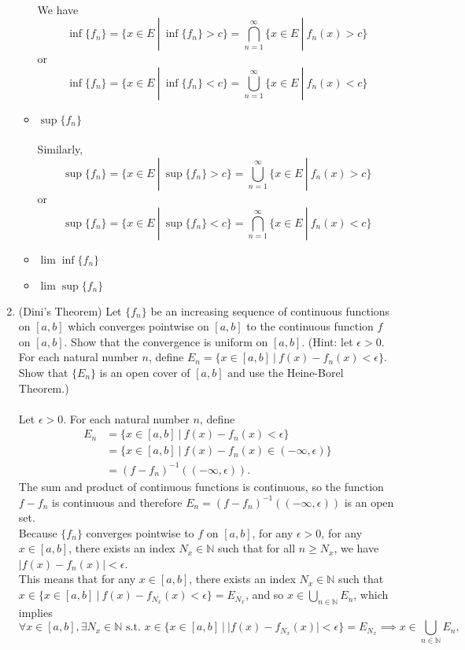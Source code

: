 \begin{enumerate}
\begin{itemize}
        \\We have 
        \[
            \inf\{f_n\} = \{x\in E\ |\ \inf\{f_n\}> c\} = \bigcap_{n=1}^\infty\{x\in E\ |\ f_n(x)>c\}
        \]
        or
        \[
            \inf\{f_n\} = \{x\in E\ |\ \inf\{f_n\}< c\} = \bigcup_{n=1}^\infty\{x\in E\ |\ f_n(x)<c\}
        \]
        \item $\sup\{f_n\}$\\
        \\Similarly,
        \[
            \sup\{f_n\} = \{x\in E\ |\ \sup\{f_n\}> c\} = \bigcup_{n=1}^\infty\{x\in E\ |\ f_n(x)>c\}
        \]
        or
        \[
            \sup\{f_n\} = \{x\in E\ |\ \sup\{f_n\}< c\} = \bigcap_{n=1}^\infty\{x\in E\ |\ f_n(x)<c\}
        \]
        \item $\lim\inf\{f_n\}$
        \item $\lim\sup\{f_n\}$
    \end{itemize}
    \item (Dini's Theorem) Let $\{f_n\}$ be an increasing sequence of continuous functions on $[a,b]$ which converges pointwise on $[a,b]$ to the continuous function $f$ on $[a,b]$.
    Show that the convergence is uniform on $[a,b]$. (Hint: let $\epsilon>0$. For each natural number $n$, define $E_n=\{x\in[a,b]\ |\ f(x)-f_n(x)<\epsilon\}$. Show that $\{E_n\}$ is an open cover of $[a,b]$ and use the Heine-Borel Theorem.)\\
    \\Let $\epsilon>0$. For each natural number $n$, define 
    \begin{align*}
        E_n&=\{x\in[a,b]\ |\ f(x)-f_n(x)<\epsilon\}\\
        &=\{x\in[a,b]\ |\ f(x)-f_n(x)\in(-\infty,\epsilon)\}\\
        &=(f-f_n)^{-1}((-\infty,\epsilon)).
    \end{align*}
    The sum and product of continuous functions is continuous, so the function $f-f_n$ is continuous and therefore $E_n=(f-f_n)^{-1}((-\infty,\epsilon))$ is an open set.
    \\Because $\{f_n\}$ converges pointwise to $f$ on $[a,b]$, for any $\epsilon>0$, for any $x\in[a,b]$, there exists an index $N_x\in\mathbb{N}$ such that for all $n\ge N_x$, we have $|f(x)-f_n(x)|<\epsilon$.
    \\This means that for any $x\in[a,b]$, there exists an index $N_x\in\mathbb{N}$ such that $x\in\{x\in[a,b]\ |\ f(x)-f_{N_x}(x)<\epsilon\}=E_{N_x}$, and so $x\in\bigcup_{n\in\mathbb{N}} E_n$, which implies
    \[
        \forall x\in[a,b],\exists N_x\in\mathbb{N}\text{ s.t. }x\in\{x\in[a,b]\ |\ |f(x)-f_{N_x}(x)|<\epsilon\}=E_{N_x}\implies x\in\bigcup_{n\in\mathbb{N}} E_n,
\]
\end{enumerate}
